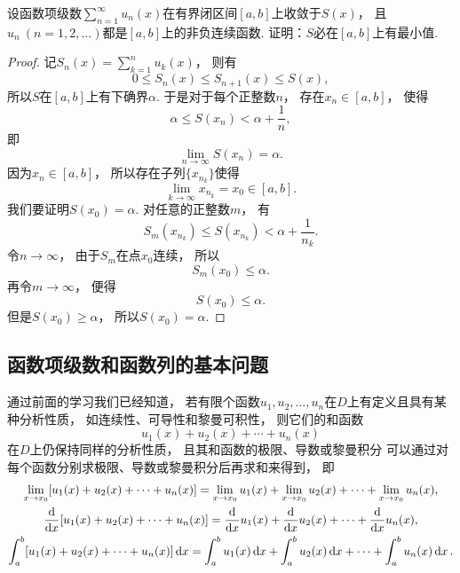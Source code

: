 \begin{example}
设函数项级数\(\sum_{n=1}^\infty u_n(x)\)在有界闭区间\([a,b]\)上收敛于\(S(x)\)，
且\(u_n\ (n=1,2,\dotsc)\)都是\([a,b]\)上的非负连续函数.
证明：\(S\)必在\([a,b]\)上有最小值.
\begin{proof}
记\(S_n(x) = \sum_{k=1}^n u_k(x)\)，
则有\begin{equation*}
	0 \leq S_n(x) \leq S_{n+1}(x) \leq S(x),
\end{equation*}
所以\(S\)在\([a,b]\)上有下确界\(\alpha\).
于是对于每个正整数\(n\)，
存在\(x_n\in[a,b]\)，
使得\begin{equation*}
	\alpha \leq S(x_n) < \alpha + \frac1n,
\end{equation*}
即\begin{equation*}
	\lim_{n\to\infty} S(x_n) = \alpha.
\end{equation*}
因为\(x_n\in[a,b]\)，
所以存在子列\(\{x_{n_k}\}\)使得\begin{equation*}
	\lim_{k\to\infty} x_{n_k} = x_0 \in [a,b].
\end{equation*}
我们要证明\(S(x_0) = \alpha\).
对任意的正整数\(m\)，
有\begin{equation*}
	S_m(x_{n_k})
	\leq S(x_{n_k})
	< \alpha + \frac1{n_k}.
\end{equation*}
令\(n\to\infty\)，
由于\(S_m\)在点\(x_0\)连续，
所以\begin{equation*}
	S_m(x_0) \leq \alpha.
\end{equation*}
再令\(m\to\infty\)，
便得\begin{equation*}
	S(x_0) \leq \alpha.
\end{equation*}
但是\(S(x_0) \geq \alpha\)，
所以\(S(x_0) = \alpha\).
\end{proof}
\end{example}

\subsection{函数项级数和函数列的基本问题}
通过前面的学习我们已经知道，
若有限个函数\(u_1,u_2,\dotsc,u_n\)在\(D\)上有定义且具有某种分析性质，
如连续性、可导性和黎曼可积性，
则它们的和函数\begin{equation*}
	u_1(x) + u_2(x) + \dotsb + u_n(x)
\end{equation*}在\(D\)上仍保持同样的分析性质，
且其和函数的极限、导数或黎曼积分
可以通过对每个函数分别求极限、导数或黎曼积分后再求和来得到，
即\begin{gather*}
	\lim_{x \to x_0} [u_1(x) + u_2(x) + \dotsb + u_n(x)]
	= \lim_{x \to x_0} u_1(x)
	+ \lim_{x \to x_0} u_2(x)
	+ \dotsb
	+ \lim_{x \to x_0} u_n(x), \\
	\dv{x} [u_1(x) + u_2(x) + \dotsb + u_n(x)]
	= \dv{x} u_1(x)
	+ \dv{x} u_2(x)
	+ \dotsb
	+ \dv{x} u_n(x), \\
	\int_a^b [u_1(x) + u_2(x) + \dotsb + u_n(x)] \dd{x}
	= \int_a^b u_1(x) \dd{x}
	+ \int_a^b u_2(x) \dd{x}
	+ \dotsb
	+ \int_a^b u_n(x) \dd{x}.
\end{gather*}


